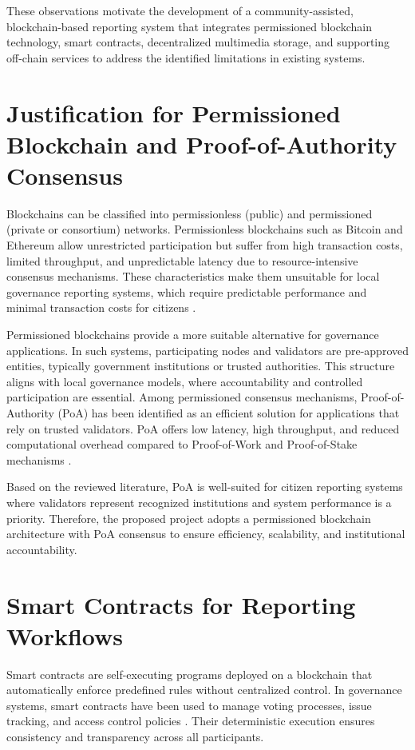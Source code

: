 These observations motivate the development of a community-assisted, blockchain-based reporting system that integrates permissioned blockchain technology, smart contracts, decentralized multimedia storage, and supporting off-chain services to address the identified limitations in existing systems.

\section{Justification for Permissioned Blockchain and Proof-of-Authority Consensus}

Blockchains can be classified into permissionless (public) and permissioned (private or consortium) networks. Permissionless blockchains such as Bitcoin and Ethereum allow unrestricted participation but suffer from high transaction costs, limited throughput, and unpredictable latency due to resource-intensive consensus mechanisms. These characteristics make them unsuitable for local governance reporting systems, which require predictable performance and minimal transaction costs for citizens \cite{zhai2022trust}.

Permissioned blockchains provide a more suitable alternative for governance applications. In such systems, participating nodes and validators are pre-approved entities, typically government institutions or trusted authorities. This structure aligns with local governance models, where accountability and controlled participation are essential. Among permissioned consensus mechanisms, Proof-of-Authority (PoA) has been identified as an efficient solution for applications that rely on trusted validators. PoA offers low latency, high throughput, and reduced computational overhead compared to Proof-of-Work and Proof-of-Stake mechanisms \cite{mohan2025police}.

Based on the reviewed literature, PoA is well-suited for citizen reporting systems where validators represent recognized institutions and system performance is a priority. Therefore, the proposed project adopts a permissioned blockchain architecture with PoA consensus to ensure efficiency, scalability, and institutional accountability.

\section{Smart Contracts for Reporting Workflows}

Smart contracts are self-executing programs deployed on a blockchain that automatically enforce predefined rules without centralized control. In governance systems, smart contracts have been used to manage voting processes, issue tracking, and access control policies \cite{goswami2020egovernance}. Their deterministic execution ensures consistency and transparency across all participants.


